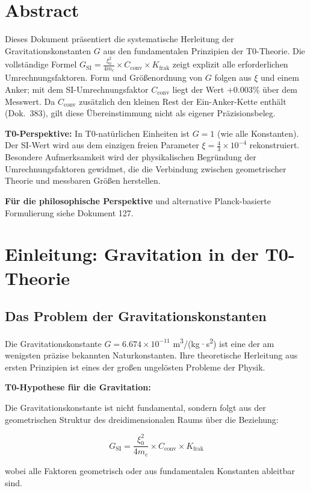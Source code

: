\section*{Abstract}
		Dieses Dokument präsentiert die systematische Herleitung der Gravitationskonstanten $G$ aus den fundamentalen Prinzipien der T0-Theorie. Die vollständige Formel $G_{\text{SI}} = \frac{\xi_0^2}{4 m_e} \times C_{\text{conv}} \times K_{\text{frak}}$ zeigt explizit alle erforderlichen Umrechnungsfaktoren. Form und Größenordnung von $G$ folgen aus $\xi$ und einem Anker; mit dem SI-Umrechnungsfaktor $C_{\text{conv}}$ liegt der Wert $+0.003\%$ über dem Messwert. Da $C_{\text{conv}}$ zusätzlich den kleinen Rest der Ein-Anker-Kette enthält (Dok.~383), gilt diese Übereinstimmung nicht als eigener Präzisionsbeleg. 
		
		\textbf{T0-Perspektive:} In T0-natürlichen Einheiten ist $G = 1$ (wie alle Konstanten). Der SI-Wert wird aus dem einzigen freien Parameter $\xi = \frac{4}{3} \times 10^{-4}$ rekonstruiert. Besondere Aufmerksamkeit wird der physikalischen Begründung der Umrechnungsfaktoren gewidmet, die die Verbindung zwischen geometrischer Theorie und messbaren Größen herstellen.
		
		\textbf{Für die philosophische Perspektive} und alternative Planck-basierte Formulierung siehe Dokument 127.

	
	
	\section{Einleitung: Gravitation in der T0-Theorie}
	
	\subsection{Das Problem der Gravitationskonstanten}
	
	Die Gravitationskonstante $G = 6.674 \times 10^{-11}$ m\textsuperscript{3}/(kg·s\textsuperscript{2}) ist eine der am wenigsten präzise bekannten Naturkonstanten. Ihre theoretische Herleitung aus ersten Prinzipien ist eines der großen ungelösten Probleme der Physik.
	
	\begin{keyresult}
		\textbf{T0-Hypothese für die Gravitation:}
		
		Die Gravitationskonstante ist nicht fundamental, sondern folgt aus der geometrischen Struktur des dreidimensionalen Raums über die Beziehung:
		
		\begin{equation}
			\boxed{G_{\text{SI}} = \frac{\xi_0^2}{4 m_e} \times C_{\text{conv}} \times K_{\text{frak}}}
			\label{eq:G_complete}
		\end{equation}
		
		wobei alle Faktoren geometrisch oder aus fundamentalen Konstanten ableitbar sind.
	\end{keyresult}
	
